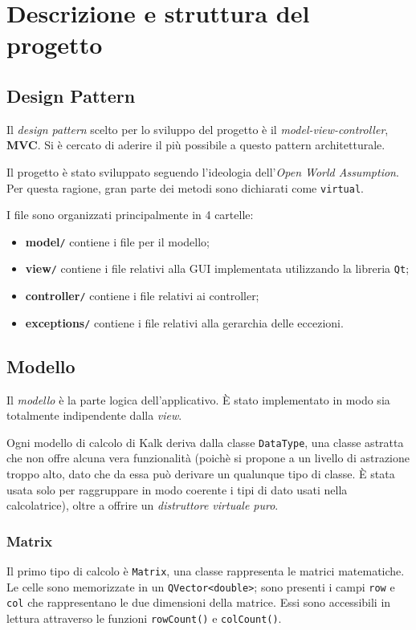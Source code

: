 \section{Descrizione e struttura del progetto}

\subsection{Design Pattern}
Il \emph{design pattern} scelto per lo sviluppo del progetto è il 
\emph{model-view-controller}, \textbf{MVC}. Si è cercato di aderire
il più possibile a questo pattern architetturale. \par
Il progetto è stato sviluppato seguendo l'ideologia dell'\emph{Open World Assumption}.
Per questa ragione, gran parte dei metodi sono dichiarati come \texttt{virtual}.\par
I file sono organizzati principalmente in 4 cartelle:
\begin{itemize}
    \item \textbf{model}\verb|/| contiene i file per il modello;
    \item \textbf{view}\verb|/| contiene i file relativi alla GUI implementata utilizzando 
    la libreria \texttt{Qt};
    \item \textbf{controller}\verb|/| contiene i file relativi ai controller;
    \item \textbf{exceptions}\verb|/| contiene i file relativi alla gerarchia delle eccezioni.
\end{itemize}


\subsection{Modello}
Il \emph{modello} è la parte logica dell'applicativo. È stato implementato in
modo sia totalmente indipendente dalla \emph{view}. \par
Ogni modello di calcolo di Kalk deriva dalla classe \texttt{DataType}, una classe
astratta che non offre alcuna vera funzionalità (poichè si propone a un livello di astrazione
troppo alto, dato che da essa può derivare un qualunque tipo di classe. È stata usata solo per
raggruppare in modo coerente i tipi di dato usati nella calcolatrice), oltre a offrire un \emph{distruttore %
virtuale puro}.
\subsubsection{Matrix}
Il primo tipo di calcolo è \texttt{Matrix}, una classe rappresenta le matrici matematiche.
Le celle sono memorizzate in un \texttt{QVector<double>}; sono presenti
i campi \texttt{row} e \texttt{col} che rappresentano le due dimensioni della matrice.
Essi sono accessibili in lettura attraverso le funzioni \texttt{rowCount()} e 
\texttt{colCount()}. \par

